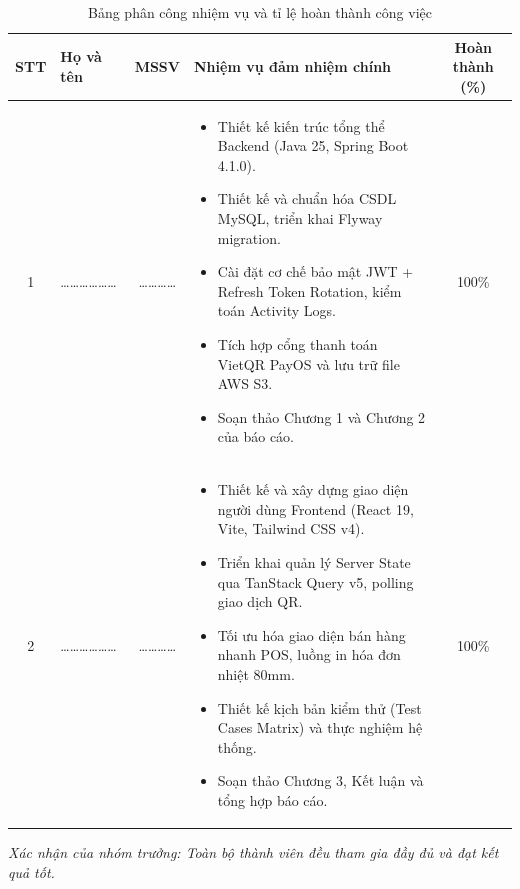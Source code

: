\begin{table}[htbp]
\centering
\caption{Bảng phân công nhiệm vụ và tỉ lệ hoàn thành công việc}
\label{tab:phan_cong_nhiem_vu}
\vspace{2mm}
\begin{tabularx}{\textwidth}{|c|p{3.5cm}|c|X|c|}
\hline
\textbf{STT} & \textbf{Họ và tên} & \textbf{MSSV} & \textbf{Nhiệm vụ đảm nhiệm chính} & \textbf{Hoàn thành (\%)} \\ \hline
1 & \dots\dots\dots\dots\dots\dots & \dots\dots\dots\dots & 
\begin{itemize}[leftmargin=*, nosep]
    \item Thiết kế kiến trúc tổng thể Backend (Java 25, Spring Boot 4.1.0).
    \item Thiết kế và chuẩn hóa CSDL MySQL, triển khai Flyway migration.
    \item Cài đặt cơ chế bảo mật JWT + Refresh Token Rotation, kiểm toán Activity Logs.
    \item Tích hợp cổng thanh toán VietQR PayOS và lưu trữ file AWS S3.
    \item Soạn thảo Chương 1 và Chương 2 của báo cáo.
\end{itemize} & 100\% \\ \hline
2 & \dots\dots\dots\dots\dots\dots & \dots\dots\dots\dots & 
\begin{itemize}[leftmargin=*, nosep]
    \item Thiết kế và xây dựng giao diện người dùng Frontend (React 19, Vite, Tailwind CSS v4).
    \item Triển khai quản lý Server State qua TanStack Query v5, polling giao dịch QR.
    \item Tối ưu hóa giao diện bán hàng nhanh POS, luồng in hóa đơn nhiệt 80mm.
    \item Thiết kế kịch bản kiểm thử (Test Cases Matrix) và thực nghiệm hệ thống.
    \item Soạn thảo Chương 3, Kết luận và tổng hợp báo cáo.
\end{itemize} & 100\% \\ \hline
\end{tabularx}
\end{table}

\begin{flushright}
    \textit{Xác nhận của nhóm trưởng: Toàn bộ thành viên đều tham gia đầy đủ và đạt kết quả tốt.}
\end{flushright}

\cleardoublepage
